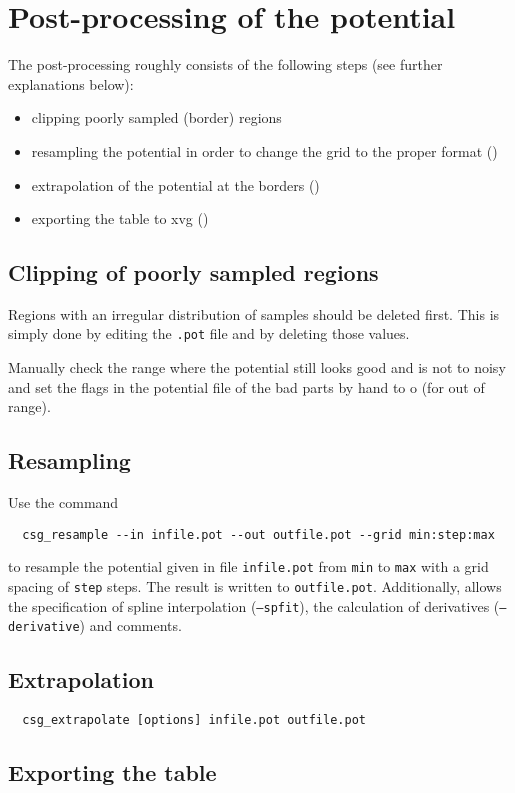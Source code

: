 \section{Post-processing of the potential}
The post-processing roughly consists of the following steps (see further explanations below):
\begin{itemize}
  \item clipping poorly sampled (border) regions
  \item resampling the potential in order to change the grid to the proper format ()
  \item extrapolation of the potential at the borders ()
  \item exporting the table to xvg ()
\end{itemize}

\subsection*{Clipping of poorly sampled regions}
Regions with an irregular distribution of samples should be deleted first. This is simply done by editing the \texttt{.pot} file and by deleting those values.

Manually check the range where the potential still looks good and is not to noisy and set the flags in the potential file of the bad parts by hand to o (for out of range).

\subsection*{Resampling}
Use the command
\begin{verbatim}
  csg_resample --in infile.pot --out outfile.pot --grid min:step:max
\end{verbatim}
to resample the potential given in file \texttt{infile.pot} from \texttt{min} to \texttt{max} with a grid spacing of \texttt{step} steps. The result is written to \texttt{outfile.pot}. Additionally,  allows the specification of spline interpolation (\texttt{--spfit}), the calculation of derivatives (\texttt{--derivative}) and comments.

\subsection*{Extrapolation}
\begin{verbatim}
  csg_extrapolate [options] infile.pot outfile.pot
\end{verbatim}

\subsection*{Exporting the table}